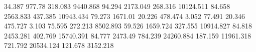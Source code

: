 34.387     977.78     %
318.083    9440.868   %
94.294     2173.049   %
268.316    10124.511  %
84.658     2563.833   %
437.385    10943.434  %
79.273     1671.01    %
20.226     478.474    %
3.052      77.491     %
20.346     475.727    %
3.103      75.595     %
272.213    8502.893   %
59.526     1659.724   %
327.555    10914.827  %
84.818     2453.281   %
402.769    15740.391  %
84.777     2473.49    %
784.239    24260.884  %
187.159    11961.318  %
721.792    20534.124  %
121.678    3152.218   %
